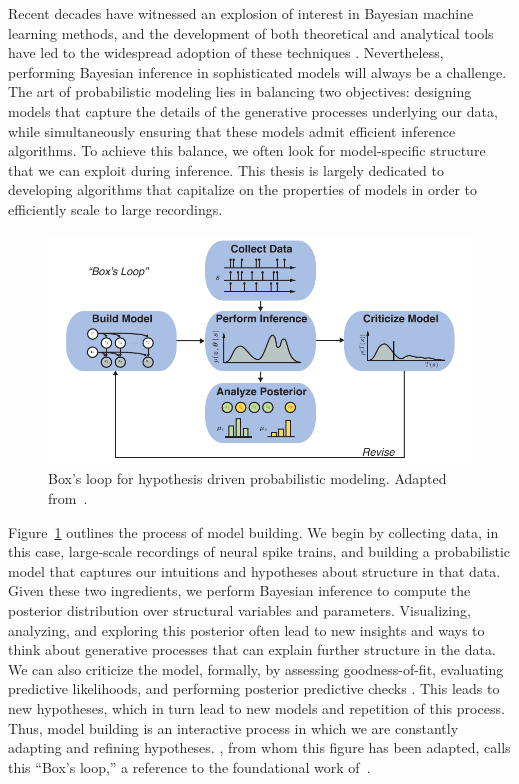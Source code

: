 Recent decades have witnessed an explosion of interest in Bayesian
machine learning methods, and the development of both theoretical and
analytical tools have led to the widespread adoption of these
techniques \citep{bishop2006pattern, murphy2012probabilistic}.
Nevertheless, performing Bayesian inference in sophisticated models
will always be a challenge. The art of probabilistic modeling lies in
balancing two objectives: designing models that capture the details of
the generative processes underlying our data, while simultaneously
ensuring that these models admit efficient inference algorithms. To
achieve this balance, we often look for model-specific structure that
we can exploit during inference.  This thesis is largely dedicated to
developing algorithms that capitalize on the properties of models in
order to efficiently scale to large recordings.


\begin{figure}[t]
  \centering%
\includegraphics[width=5.5in]{figures/ch1/boxloop} 
\caption[Box's loop]{Box's loop for hypothesis driven probabilistic modeling.
Adapted from~\citet{blei2014build}.}
\label{fig:boxloop}
\end{figure}

Figure~\ref{fig:boxloop} outlines the process of model building.  We
begin by collecting data, in this case, large-scale recordings of
neural spike trains, and building a probabilistic model that captures
our intuitions and hypotheses about structure in that data. Given
these two ingredients, we perform Bayesian inference to compute the
posterior distribution over structural variables and
parameters. Visualizing, analyzing, and exploring this posterior often
lead to new insights and ways to think about generative processes that
can explain further structure in the data. We can also criticize the
model, formally, by assessing goodness-of-fit, evaluating predictive
likelihoods, and performing posterior predictive checks
\citep{Gelman13}. This leads to new hypotheses, which in turn lead to
new models and repetition of this process.  Thus, model building is an
interactive process in which we are constantly adapting and refining
hypotheses.  \citet{blei2014build}, from whom this figure has been
adapted, calls this ``Box's loop,'' a reference to the foundational
work of~\citet{box1980sampling}.



